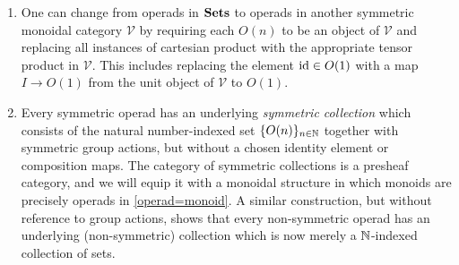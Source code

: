\begin{rem}
\begin{enumerate}
\item One can change from operads in $\mathbf{Sets}$ to operads in another symmetric monoidal category $\mathcal{V}$ by requiring each $O(n)$ to be an object of $\mathcal{V}$ and replacing all instances of cartesian product with the appropriate tensor product in $\mathcal{V}$. This includes replacing the element $\textrm{id} \in O(1)$ with a map $I \rightarrow O(1)$ from the unit object of $\mathcal{V}$ to $O(1)$.
\item Every symmetric operad has an underlying \textit{symmetric collection} which consists of the natural number-indexed set $\{ O(n) \}_{n \in \mathbb{N}}$ together with symmetric group actions, but without a chosen identity element or composition maps. The category of symmetric collections is a presheaf category, and we will equip it with a monoidal structure in which monoids are precisely operads in \cref{operad=monoid}. A similar construction, but without reference to group actions, shows that every non-symmetric operad has an underlying (non-symmetric) collection which is now merely a $\mathbb{N}$-indexed collection of sets.
\end{enumerate}
\end{rem}

